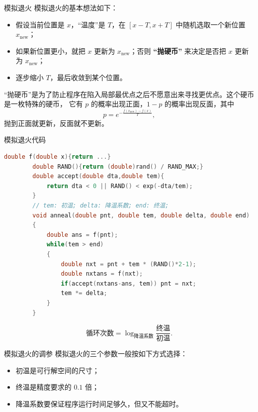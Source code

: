 \documentclass{beamer}
\begin{document}
\begin{frame}{模拟退火}
    \small
    模拟退火的基本想法如下：
    \begin{itemize}
        \item 假设当前位置是 $x$，“温度”是 $T$，在 $[x-T,x+T]$ 中随机选取一个新位置 $x_\text{new}$；
        \pause
        \item 如果新位置更小，就把 $x$ 更新为 $x_\text{new}$；否则 \textbf{“抛硬币”} 来决定是否把 $x$ 更新为 $x_\text{new}$；
        \pause
        \item 逐步缩小 $T$，最后收敛到某个位置。
    \end{itemize}
    \pause
    “抛硬币”是为了防止程序在陷入局部最优点之后不愿意出来寻找更优点。\pause 这个硬币是一枚特殊的硬币，
    它有 $p$ 的概率出现正面，$1-p$ 的概率出现反面，其中
    \begin{equation*}
        p=e^{-\frac{f(x_\text{new})-f(x)}{T}},
    \end{equation*}
    抛到正面就更新，反面就不更新。
\end{frame}

\begin{frame}[fragile]{模拟退火代码}
    \small
    \begin{lstlisting}[language=c++]
        double f(double x){return ...}
        double RAND(){return (double)rand() / RAND_MAX;}
        double accept(double dta,double tem){
            return dta < 0 || RAND() < exp(-dta/tem);
        }
        // tem: 初温; delta: 降温系数; end: 终温;
        void anneal(double pnt, double tem, double delta, double end)
        {
            double ans = f(pnt);
            while(tem > end)
            {
                double nxt = pnt + tem * (RAND()*2-1);
                double nxtans = f(nxt);
                if(accept(nxtans-ans, tem)) pnt = nxt;
                tem *= delta;
            }
        }
    \end{lstlisting}

    \begin{equation*}
        \text{循环次数}=\log_{\text{降温系数}}\frac{\text{终温}}{\text{初温}}.
    \end{equation*}
\end{frame}

\begin{frame}{模拟退火的调参}
    \small
    模拟退火的三个参数一般按如下方式选择：
    \begin{itemize}
        \item 初温是可行解空间的尺寸；
        \item 终温是精度要求的 $0.1$ 倍；
        \item 降温系数要保证程序运行时间足够久，但又不能超时。
    \end{itemize}
\end{frame}
\end{document}
